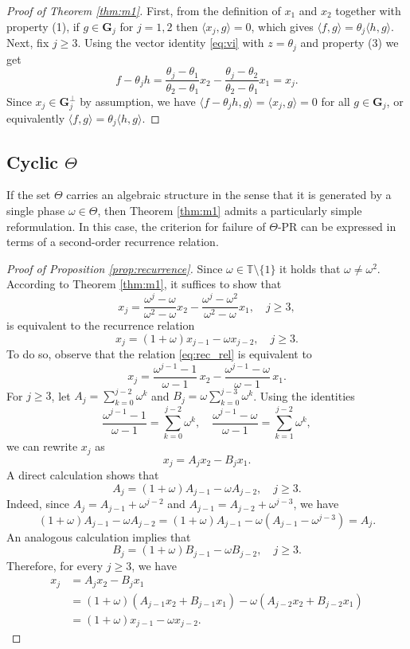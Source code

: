 \documentclass[reqno,a4paper,11pt]{amsart}
\numberwithin{equation}{section}
\def\T{{\mathbb T}}
\newcommand\1{\mathds{1}}
\begin{document}
\begin{proof}[Proof of Theorem \ref{thm:m1}]
First, from the definition of $x_1$ and $x_2$ together with property (1), if $g\in \mathbf{G}_j$ for $j=1,2$ then $\langle x_j,g\rangle=0$, which gives $\langle f,g\rangle = \theta_j\langle h,g\rangle$. Next, fix $j\geq 3$. Using the vector identity \eqref{eq:vi} with $z=\theta_j$ and property (3) we get 
$$
f-\theta_j h = \frac{\theta_j - \theta_1}{\theta_2 - \theta_1} x_2 - \frac{\theta_j - \theta_2}{\theta_2 - \theta_1} x_1 = x_j.
$$
Since $x_j\in \mathbf{G}^\perp_j$ by assumption, we have $\langle f-\theta_j h,g\rangle = \langle x_j,g\rangle=0$ for all $g\in \mathbf{G}_j$, or equivalently $\langle f,g\rangle = \theta_j\langle h,g\rangle$. 
\end{proof}

\subsection{Cyclic $\Theta$}

If the set $\Theta$ carries an algebraic structure in the sense that it is generated by a single phase $\omega \in \Theta$, then Theorem \ref{thm:m1} admits a particularly simple reformulation. In this case, the criterion for failure of $\Theta$-PR can be expressed in terms of a second-order recurrence relation.

\begin{proof}[Proof of Proposition \ref{prop:recurrence}] 
    Since $\omega \in \T\setminus\{1\}$ it holds that $\omega \neq \omega^2$. According to Theorem \ref{thm:m1}, it suffices to show that
    \begin{equation}\label{eq:rec_rel}
        x_ j = \frac{\omega^j-\omega}{\omega^2-\omega}x_2 - \frac{\omega^j-\omega^2}{\omega^2-\omega}x_1, \quad j \geq 3,
    \end{equation}
    is equivalent to the recurrence relation
    $$
    x_j = (1+\omega)x_{j-1} - \omega x_{j-2}, \quad j \geq 3.
    $$
    To do so, observe that the relation \eqref{eq:rec_rel} is equivalent to
\[
x_j = \frac{\omega^{j-1}-1}{\omega-1}\,x_2 - \frac{\omega^{j-1}-\omega}{\omega-1}\,x_1.
\]
For $j \geq 3$, let $A_j=\sum_{k=0}^{j-2} \omega^k$ and $B_j=\omega \sum_{k=0}^{j-3} \omega^k$.
Using the identities
$$
\frac{\omega^{j-1}-1}{\omega-1} = \sum_{k=0}^{j-2} \omega^k,
\quad
\frac{\omega^{j-1}-\omega}{\omega-1} = \sum_{k=1}^{j-2} \omega^k,
$$
we can rewrite $x_j$ as
$$
x_j = A_j x_2
-
B_j x_1.
$$
A direct calculation shows that
$$
A_j = (1+\omega)A_{j-1} - \omega A_{j-2}, \quad j \geq 3.
$$
Indeed, since $A_j = A_{j-1} + \omega^{j-2}$ and
$A_{j-1} = A_{j-2} + \omega^{j-3}$, we have
$$
(1+\omega)A_{j-1} - \omega A_{j-2}
= (1+\omega)A_{j-1} - \omega(A_{j-1} - \omega^{j-3})
= A_j.
$$
An analogous calculation implies that
$$
B_j = (1+\omega)B_{j-1} - \omega B_{j-2}, \quad j \geq 3.
$$
Therefore, for every $j \geq 3$, we have
\begin{align*}
x_j
&= A_j x_2 - B_j x_1 \\
&= (1+\omega)(A_{j-1} x_2 + B_{j-1} x_1)
   - \omega(A_{j-2} x_2 + B_{j-2} x_1) \\
&= (1+\omega)x_{j-1} - \omega x_{j-2}.
\end{align*}
\end{proof}
\end{document}

